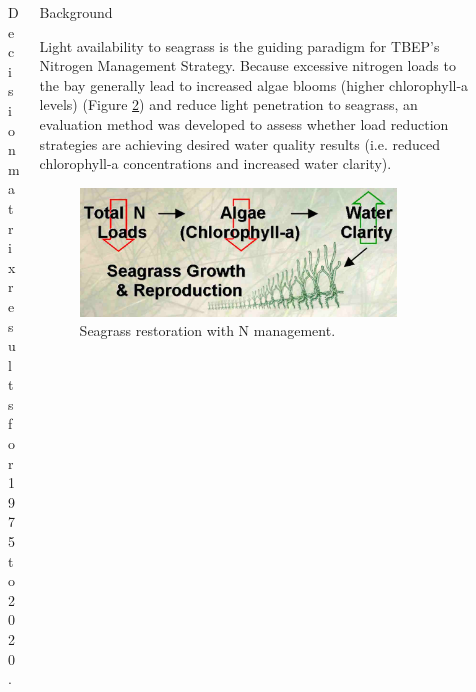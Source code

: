 \documentclass[final,t]{beamer}\usepackage[]{graphicx}\usepackage[]{color}
\begin{document}
\begin{frame}
\begin{columns}[t]
\begin{column}{.2\linewidth}
\begin{figure}
\caption{\footnotesize Decision matrix results for 1975 to 2020.}
\label{fig:attainmat}
\end{figure}

\end{column}

\begin{column}{.79\linewidth}

\begin{block}{Background}
\begin{minipage}{0.5\textwidth}
\vspace{-0.2in}
\footnotesize
Light availability to seagrass is the guiding paradigm for TBEP's Nitrogen Management Strategy. Because excessive nitrogen loads to the bay generally lead to increased algae blooms (higher chlorophyll-a levels) (Figure \ref{fig:nitro}) and reduce light penetration to seagrass, an evaluation method was developed to assess whether load reduction strategies are achieving desired water quality results (i.e. reduced chlorophyll-a concentrations and increased water clarity).
\end{minipage}
\hspace{0.1in}
\begin{minipage}{0.45\textwidth}
\begin{figure}
\includegraphics[width=0.9\textwidth]{www/nitro.jpg}
\caption{\footnotesize Seagrass restoration with N management.}
\label{fig:nitro}
\end{figure}
\end{minipage}
\vspace{-0.2in}
\end{block}


\end{column}
\end{columns}
\end{frame}
\end{document}
